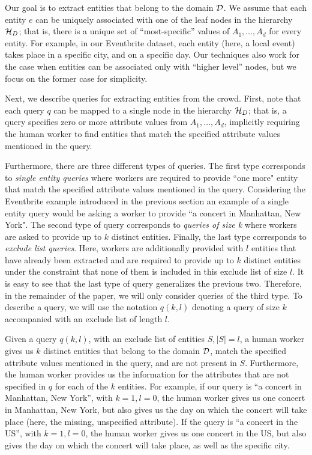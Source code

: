  Our goal is to extract entities that belong to the domain $\mathcal{D}$. We assume that each entity $e$ can be uniquely associated with one of the leaf nodes in the hierarchy $\mathcal{H}_D$; that is, there is a unique set of ``most-specific'' values of $A_1, \ldots, A_d$ for every entity. For example, in our Eventbrite dataset, each entity (here, a local event) takes place in a specific city, and on a specific day. Our techniques also work for the case when entities can be associated only with ``higher level'' nodes, but we focus on the former case for simplicity.

 Next, we describe queries for extracting entities from the crowd. First, note that each query $q$ can be mapped to a single node in the hierarchy $\mathcal{H}_D$; that is, a query specifies zero or more attribute values from $A_1, \ldots, A_d$, implicitly requiring the human worker to find entities that match the specified attribute values mentioned in the query.  

Furthermore, there are three different types of queries. The first type corresponds to {\em single entity queries} where workers are required to provide ``one more" entity that match the specified attribute values mentioned in the query. Considering the Eventbrite example introduced in the previous section an example of a single entity query would be asking a worker to provide ``a concert in Manhattan, New York". The second type of query corresponds to {\em queries of size k} where workers are asked to provide up to $k$ distinct entities. Finally, the last type corresponds to {\em exclude list queries}. Here,  workers are additionally provided with $l$ entities that have already been extracted and are required to provide up to $k$ distinct entities under the constraint that none of them is included in this exclude list of size $l$. It is easy to see that the last type of query generalizes the previous two. Therefore, in the remainder of the paper, we will only consider queries of the third type. To describe a query, we will use the notation $q(k,l)$ denoting a query of size $k$ accompanied with an exclude list of length $l$. 

 Given a query $q(k, l)$, with an exclude list of entities $S, |S| = l$, a human worker gives us $k$ distinct entities that belong to the domain $\mathcal{D}$, match the specified attribute values mentioned in the query, and are not present in $S$. Furthermore, the human worker provides us the information for the attributes that are not specified in $q$ for each of the $k$ entities. For example, if our query is ``a concert in Manhattan, New York'', with $k = 1, l = 0$, the human worker gives us one concert in Manhattan, New York, but also gives us the day on which the concert will take place (here, the missing, unspecified attribute). If the query is ``a concert in the US'', with $k = 1, l = 0$, the human worker gives us one concert in the US, but also gives the day on which the concert will take place, as well as the specific city. 

